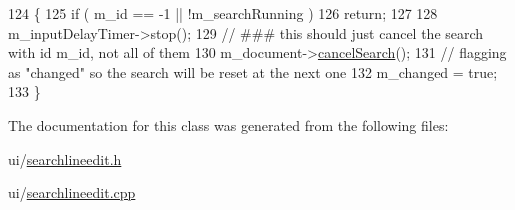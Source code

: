 \begin{DoxyCode}
124 \{
125     \textcolor{keywordflow}{if} ( m\_id == -1 || !m\_searchRunning )
126         \textcolor{keywordflow}{return};
127 
128     m\_inputDelayTimer->stop();
129     \textcolor{comment}{// ### this should just cancel the search with id m\_id, not all of them}
130     m\_document->\hyperlink{classOkular_1_1Document_a1f2fa321ed9357c5110b78a0c2502a8d}{cancelSearch}();
131     \textcolor{comment}{// flagging as "changed" so the search will be reset at the next one}
132     m\_changed = \textcolor{keyword}{true};
133 \}
\end{DoxyCode}


The documentation for this class was generated from the following files\+:\begin{DoxyCompactItemize}
\item 
ui/\hyperlink{searchlineedit_8h}{searchlineedit.\+h}\item 
ui/\hyperlink{searchlineedit_8cpp}{searchlineedit.\+cpp}\end{DoxyCompactItemize}
